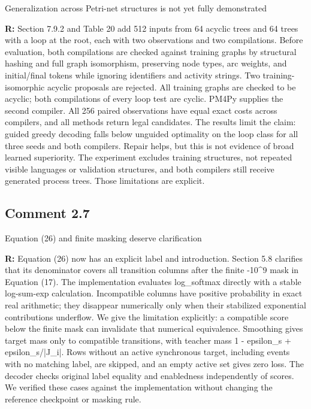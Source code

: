 \documentclass[11pt,a4paper]{article}
\newenvironment{reviewercomment}{%
  \begin{list}{}{\setlength{\leftmargin}{1.5em}%
    \setlength{\rightmargin}{0pt}\setlength{\topsep}{0.5em}}%
  \item\relax\color{reviewerred}\ignorespaces
}{\end{list}}
\begin{document}
\begin{reviewercomment}Generalization across Petri-net structures is not yet fully demonstrated\end{reviewercomment}

{\color{black}\textbf{R:} Section 7.9.2 and Table 20 add 512 inputs from 64 acyclic trees and 64 trees with a loop at the root, each with two observations and two compilations. Before evaluation, both compilations are checked against training graphs by structural hashing and full graph isomorphism, preserving node types, arc weights, and initial/final tokens while ignoring identifiers and activity strings. Two training-isomorphic acyclic proposals are rejected. All training graphs are checked to be acyclic; both compilations of every loop test are cyclic. PM4Py supplies the second compiler. All 256 paired observations have equal exact costs across compilers, and all methods return legal candidates. The results limit the claim: guided greedy decoding falls below unguided optimality on the loop class for all three seeds and both compilers. Repair helps, but this is not evidence of broad learned superiority. The experiment excludes training structures, not repeated visible languages or validation structures, and both compilers still receive generated process trees. Those limitations are explicit.\par}

\subsection*{Comment 2.7}

\begin{reviewercomment}Equation (26) and finite masking deserve clarification\end{reviewercomment}

{\color{black}\textbf{R:} Equation (26) now has an explicit label and introduction. Section 5.8 clarifies that its denominator covers all transition columns after the finite -10\textasciicircum{}9 mask in Equation (17). The implementation evaluates log\_softmax directly with a stable log-sum-exp calculation. Incompatible columns have positive probability in exact real arithmetic; they disappear numerically only when their stabilized exponential contributions underflow. We give the limitation explicitly: a compatible score below the finite mask can invalidate that numerical equivalence. Smoothing gives target mass only to compatible transitions, with teacher mass 1 - epsilon\_s + epsilon\_s/|J\_i|. Rows without an active synchronous target, including events with no matching label, are skipped, and an empty active set gives zero loss. The decoder checks original label equality and enabledness independently of scores. We verified these cases against the implementation without changing the reference checkpoint or masking rule.\par}
\end{document}
